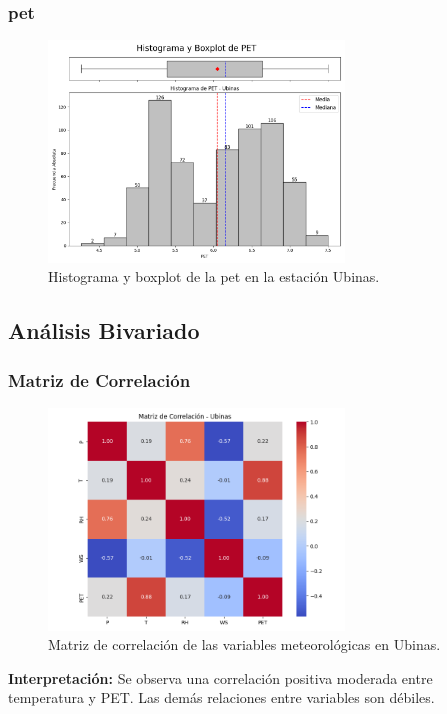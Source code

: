\subsubsection*{\gls{pet} }
\begin{figure}[htbp]
\centering
\includegraphics[width=0.7\textwidth]{resultados/por_estacion_meteorologica/Ubinas/PET_histograma.png}
\caption{Histograma y boxplot de la \gls{pet}  en la estación Ubinas.}
\label{fig:ubinas_PET}
\end{figure}

\subsection{Análisis Bivariado}

\subsubsection*{Matriz de Correlación}
\begin{figure}[htbp]
\centering
\includegraphics[width=0.7\textwidth]{resultados/por_estacion_meteorologica/Ubinas/matriz_correlacion.png}
\caption{Matriz de correlación de las variables meteorológicas en Ubinas.}
\label{fig:ubinas_corr}
\end{figure}
\textbf{Interpretación:} Se observa una correlación positiva moderada entre temperatura y PET. Las demás relaciones entre variables son débiles.

